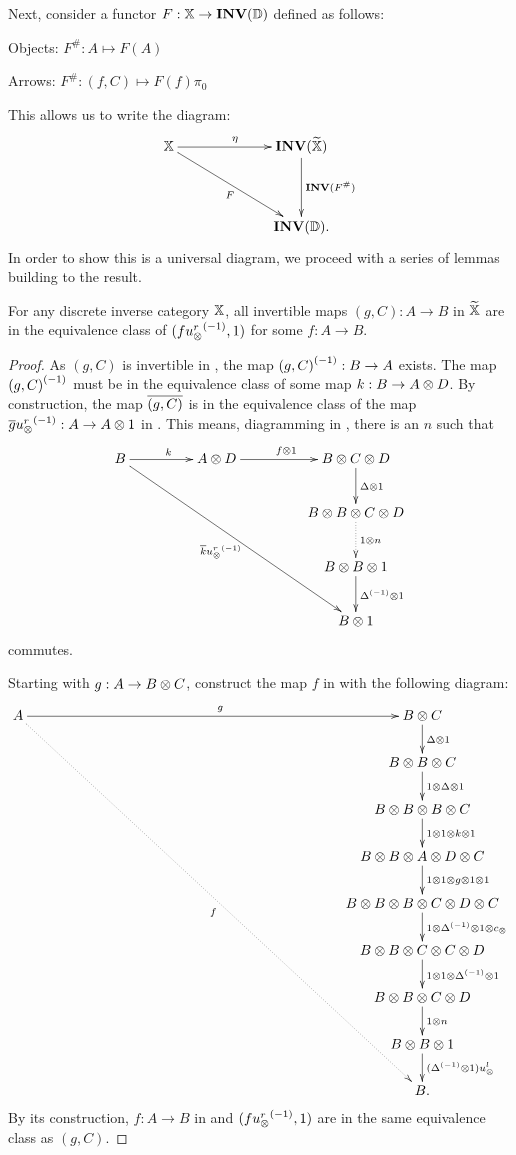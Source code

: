 Next, consider a functor $F:\mathbb{X} \to \mathbf{INV}({\mathbb{D}})$ defined as follows:
\begin{description}
  \item{Objects:} $F^{\#}:A \mapsto F(A)$
  \item{Arrows:} $F^{\#}:(f,C) \mapsto F(f)\pi_0$
\end{description}

This allows us to write the diagram:
\begin{equation}
  \xymatrix @C=65pt @R=40pt{
    \X \ar[r]^{\eta} \ar[rd]_{F}& \Inv{\Xt} \ar[d]^{\Inv{F^{\#}}}\\
    &\Inv{\D}.
  }
  \label{dia:universal_property_of_inverse_categories}
\end{equation}
In order to show this is a universal diagram, we proceed with a series of lemmas building to the
result.

\begin{lemma}\label{lem:all_invertible_maps_in_xt_are_of_the_form_f_inv_usr}
  For any discrete inverse category $\mathbb{X}$, all invertible maps $(g,C):A\to B$ in $\widetilde{\mathbb{X}}$ are in the
  equivalence class of $(f {u_{\otimes}^r}^{(-1)},1)$ for some $f:A\to B$.
\end{lemma}
\begin{proof}
  As $(g,C)$ is invertible in \Xt, the map ${(g,C)}^{(-1)}: B \to A$ exists. The map ${(g,C)}^{(-1)}$ must be in
  the equivalence class of some map $k:B \to A \otimes D$. By construction, the map  $\overline{(g,C)}$ is
  in the equivalence class of the map $\overline{g}{u_{\otimes}^r}^{(-1)}:A \to A\otimes1$ in \X. This means,
  diagramming in \X, there is an $n$ such that
  \[
    \xymatrix @C=45pt @R=25pt{
      B \ar[r]^{k} \ar[rrddd]_{\rst{k}\inv{\usr}}
        & A \*D \ar[r]^{f\*1}&B\*C\*D \ar[d]^{\Delta\*1}\\
      & &  B\*B\*C\*D \ar@{.>}[d]^{1\* n} \\
      & &  B\*B\*1 \ar[d]^{\inv{\Delta}\* 1}\\
      && B\* 1
    }
  \]
  commutes.

  Starting with $g:A\to B\otimes C$, construct the map $f$ in \X with the following diagram:
  \[
    \xymatrix @C=225pt @R=20pt{
      A \ar[r]^{g} \ar@{.>}[rdddddddd]_{f}& B \*C \ar[d]^{\Delta\*1}\\
      &B\*B\*C \ar[d]^{1\*\Delta\*1}\\
      &B\*B\*B\*C \ar[d]^{1\*1\*k\*1}\\
      &B\*B\*A\*D\*C \ar[d]^{1\*1\*g\*1\*1}\\
      &B\*B\*B\*C\*D\*C \ar[d]^{1\*\inv{\Delta}\*1\*c_{\*}}\\
      &B\*B\*C\*C\*D \ar[d]^{1\*1\*\inv{\Delta}\*1}\\
      &B\*B\*C\*D \ar[d]^{1\*n}\\
      &B\*B\*1 \ar[d]^{(\inv{\Delta}\* 1) \usl }\\
      &B.
    }
  \]
  By its construction, $f:A\to B$ in \X and $(f{u_{\otimes}^r}^{(-1)},1)$ are in the same equivalence class as
  $(g,C)$.

\end{proof}

